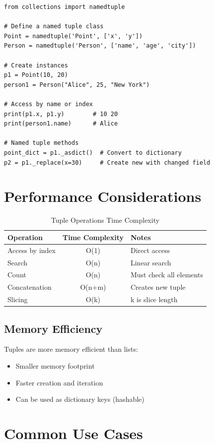 \documentclass[12pt,a4paper]{article}
\begin{document}
\begin{lstlisting}
from collections import namedtuple

# Define a named tuple class
Point = namedtuple('Point', ['x', 'y'])
Person = namedtuple('Person', ['name', 'age', 'city'])

# Create instances
p1 = Point(10, 20)
person1 = Person("Alice", 25, "New York")

# Access by name or index
print(p1.x, p1.y)        # 10 20
print(person1.name)      # Alice

# Named tuple methods
point_dict = p1._asdict()  # Convert to dictionary
p2 = p1._replace(x=30)     # Create new with changed field
\end{lstlisting}

\section{Performance Considerations}

\begin{table}[h]
\centering
\begin{tabular}{|l|c|l|}
\hline
\textbf{Operation} & \textbf{Time Complexity} & \textbf{Notes} \\
\hline
Access by index & O(1) & Direct access \\
Search & O(n) & Linear search \\
Count & O(n) & Must check all elements \\
Concatenation & O(n+m) & Creates new tuple \\
Slicing & O(k) & k is slice length \\
\hline
\end{tabular}
\caption{Tuple Operations Time Complexity}
\end{table}

\subsection{Memory Efficiency}

Tuples are more memory efficient than lists:
\begin{itemize}
    \item Smaller memory footprint
    \item Faster creation and iteration
    \item Can be used as dictionary keys (hashable)
\end{itemize}

\section{Common Use Cases}
\end{document}
